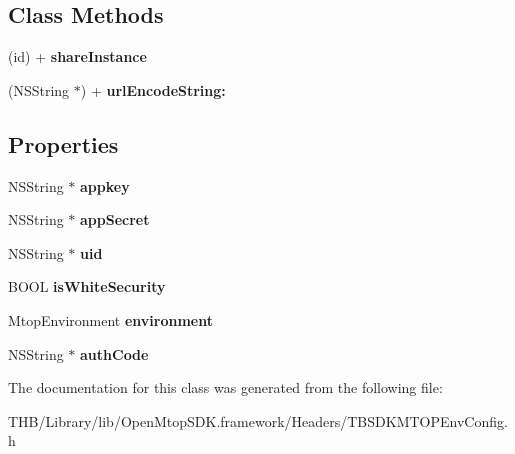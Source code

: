 \subsection*{Class Methods}
\begin{DoxyCompactItemize}
\item 
\mbox{\label{interface_t_b_s_d_k_m_t_o_p_env_config_a1bdbb22542b97d1998f4372ac311ba24}} 
(id) + {\bfseries share\+Instance}
\item 
\mbox{\label{interface_t_b_s_d_k_m_t_o_p_env_config_ae750ad5e67831cacf1060e44718c524d}} 
(N\+S\+String $\ast$) + {\bfseries url\+Encode\+String\+:}
\end{DoxyCompactItemize}
\subsection*{Properties}
\begin{DoxyCompactItemize}
\item 
\mbox{\label{interface_t_b_s_d_k_m_t_o_p_env_config_a02a654bb890b9553b7357c8456aa98f4}} 
N\+S\+String $\ast$ {\bfseries appkey}
\item 
\mbox{\label{interface_t_b_s_d_k_m_t_o_p_env_config_ad7b5b82d1771566c3dfdcb3b05a60176}} 
N\+S\+String $\ast$ {\bfseries app\+Secret}
\item 
\mbox{\label{interface_t_b_s_d_k_m_t_o_p_env_config_a613c71393028077ecccd13543a66ac34}} 
N\+S\+String $\ast$ {\bfseries uid}
\item 
\mbox{\label{interface_t_b_s_d_k_m_t_o_p_env_config_af892ad8eeb2489e1b6086c8dce084904}} 
B\+O\+OL {\bfseries is\+White\+Security}
\item 
\mbox{\label{interface_t_b_s_d_k_m_t_o_p_env_config_a93813d5ebfe7488e4af3f17fe7d9854f}} 
Mtop\+Environment {\bfseries environment}
\item 
\mbox{\label{interface_t_b_s_d_k_m_t_o_p_env_config_ae8f72f996f49c9133daedff9912dad69}} 
N\+S\+String $\ast$ {\bfseries auth\+Code}
\end{DoxyCompactItemize}


The documentation for this class was generated from the following file\+:\begin{DoxyCompactItemize}
\item 
T\+H\+B/\+Library/lib/\+Open\+Mtop\+S\+D\+K.\+framework/\+Headers/T\+B\+S\+D\+K\+M\+T\+O\+P\+Env\+Config.\+h\end{DoxyCompactItemize}
